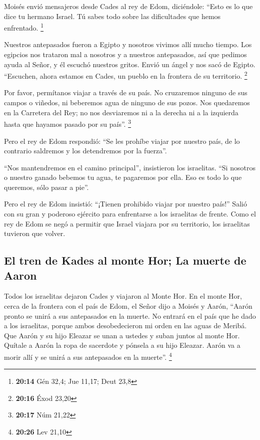  Moisés envió mensajeros desde Cades al rey de Edom,
diciéndole: ``Esto es lo que dice tu hermano Israel. Tú sabes todo sobre
las dificultades que hemos enfrentado. \footnote{\textbf{20:14} Gén
  32,4; Jue 11,17; Deut 23,8}

 Nuestros antepasados fueron a Egipto y nosotros vivimos
allí mucho tiempo. Los egipcios nos trataron mal a nosotros y a nuestros
antepasados,  así que pedimos ayuda al Señor, y él
escuchó nuestros gritos. Envió un ángel y nos sacó de Egipto.
``Escuchen, ahora estamos en Cades, un pueblo en la frontera de su
territorio. \footnote{\textbf{20:16} Éxod 23,20}

 Por favor, permítanos viajar a través de su país. No
cruzaremos ninguno de sus campos o viñedos, ni beberemos agua de ninguno
de sus pozos. Nos quedaremos en la Carretera del Rey; no nos desviaremos
ni a la derecha ni a la izquierda hasta que hayamos pasado por su
país''. \footnote{\textbf{20:17} Núm 21,22}

 Pero el rey de Edom respondió: ``Se les prohíbe viajar
por nuestro país, de lo contrario saldremos y los detendremos por la
fuerza''.

 ``Nos mantendremos en el camino principal'', insistieron
los israelitas. ``Si nosotros o nuestro ganado bebemos tu agua, te
pagaremos por ella. Eso es todo lo que queremos, sólo pasar a pie''.

 Pero el rey de Edom insistió: ``¡Tienen prohibido viajar
por nuestro país!'' Salió con su gran y poderoso ejército para
enfrentarse a los israelitas de frente.  Como el rey de
Edom se negó a permitir que Israel viajara por su territorio, los
israelitas tuvieron que volver.

\hypertarget{el-tren-de-kades-al-monte-hor-la-muerte-de-aaron}{%
\subsection{El tren de Kades al monte Hor; La muerte de
Aaron}\label{el-tren-de-kades-al-monte-hor-la-muerte-de-aaron}}

 Todos los israelitas dejaron Cades y viajaron al Monte
Hor.  En el monte Hor, cerca de la frontera con el país
de Edom, el Señor dijo a Moisés y Aarón,  ``Aarón pronto
se unirá a sus antepasados en la muerte. No entrará en el país que he
dado a los israelitas, porque ambos desobedecieron mi orden en las aguas
de Meribá.  Que Aarón y su hijo Eleazar se unan a ustedes
y suban juntos al monte Hor.  Quítale a Aarón la ropa de
sacerdote y pónsela a su hijo Eleazar. Aarón va a morir allí y se unirá
a sus antepasados en la muerte''. \footnote{\textbf{20:26} Lev 21,10}

